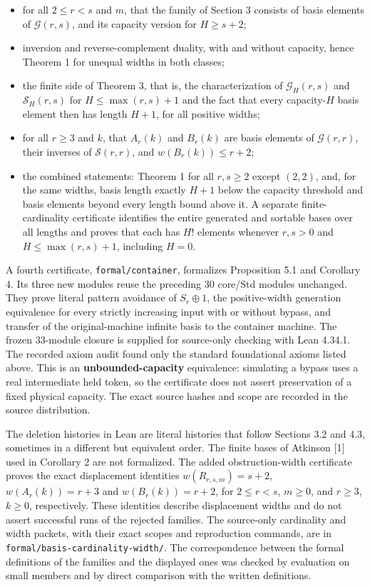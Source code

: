 \documentclass[11pt,letterpaper]{article}
\providecommand{\tightlist}{\setlength{\itemsep}{0pt}\setlength{\parskip}{0pt}}
\begin{document}
\begin{itemize}
\tightlist
\item
  for all \(2\le r<s\) and \(m\), that the family of Section 3 consists
  of basis elements of \(\mathcal G(r,s)\), and its capacity version for
  \(H\ge s+2\);
\item
  inversion and reverse-complement duality, with and without capacity,
  hence Theorem 1 for unequal widths in both classes;
\item
  the finite side of Theorem 3, that is, the characterization of
  \(\mathcal G_H(r,s)\) and \(\mathcal S_H(r,s)\) for
  \(H\le\max(r,s)+1\) and the fact that every capacity-\(H\) basis
  element then has length \(H+1\), for all positive widths;
\item
  for all \(r\ge3\) and \(k\), that \(A_r(k)\) and \(B_r(k)\) are basis
  elements of \(\mathcal G(r,r)\), their inverses of
  \(\mathcal S(r,r)\), and \(w(B_r(k))\le r+2\);
\item
  the combined statements: Theorem 1 for all \(r,s\ge2\) except
  \((2,2)\), and, for the same widths, basis length exactly \(H+1\)
  below the capacity threshold and basis elements beyond every length
  bound above it. A separate finite-cardinality certificate identifies the entire generated and sortable bases over all lengths and proves that each has \(H!\) elements whenever \(r,s>0\) and \(H\le\max(r,s)+1\), including \(H=0\).
\end{itemize}

A fourth certificate, \texttt{formal/container}, formalizes Proposition
5.1 and Corollary 4. Its three new modules reuse the preceding 30
core/Std modules unchanged. They prove literal pattern avoidance of
\(S_r\oplus1\), the positive-width generation equivalence for every
strictly increasing input with or without bypass, and transfer of the
original-machine infinite basis to the container machine. The frozen
33-module closure is supplied for source-only checking with Lean 4.34.1. The recorded axiom audit found
only the standard foundational axioms listed above. This is an
\textbf{unbounded-capacity} equivalence: simulating a bypass uses a real
intermediate held token, so the certificate does not assert preservation
of a fixed physical capacity. The exact source hashes and scope are recorded in the source distribution.

The deletion histories in Lean are literal histories that follow
Sections 3.2 and 4.3, sometimes in a different but equivalent order. The
finite bases of Atkinson {[}1{]} used in Corollary 2 are not formalized.
The added obstruction-width certificate proves the exact displacement identities \(w(R_{r,s,m})=s+2\), \(w(A_r(k))=r+3\) and \(w(B_r(k))=r+2\), for \(2\le r<s\), \(m\ge0\), and \(r\ge3\), \(k\ge0\), respectively. These identities describe displacement widths and do not assert successful runs of the rejected families. The source-only cardinality and width packets, with their exact scopes and reproduction commands, are in \texttt{formal/basis-cardinality-width/}. The
correspondence between the formal definitions of the families and the
displayed ones was checked by evaluation on small members and by
direct comparison with the written definitions.
\end{document}
